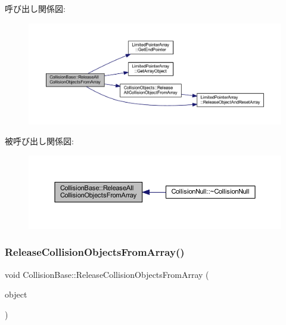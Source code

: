 呼び出し関係図\+:\nopagebreak
\begin{figure}[H]
\begin{center}
\leavevmode
\includegraphics[width=350pt]{class_collision_base_a54d52219e2bf43ed2a9b2a11813934ea_cgraph}
\end{center}
\end{figure}
被呼び出し関係図\+:\nopagebreak
\begin{figure}[H]
\begin{center}
\leavevmode
\includegraphics[width=350pt]{class_collision_base_a54d52219e2bf43ed2a9b2a11813934ea_icgraph}
\end{center}
\end{figure}
\mbox{\label{class_collision_base_a46bbb58a0dd818fc172f34462b1d5b08}} 
\subsubsection{\texorpdfstring{Release\+Collision\+Objects\+From\+Array()}{ReleaseCollisionObjectsFromArray()}}
{\footnotesize\ttfamily void Collision\+Base\+::\+Release\+Collision\+Objects\+From\+Array (\begin{DoxyParamCaption}\item[{\mbox{\hyperlink{class_collision_objects}{Collision\+Objects}} $\ast$}]{object }\end{DoxyParamCaption})\hspace{0.3cm}{\ttfamily [inline]}}



